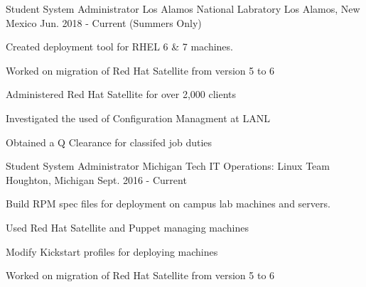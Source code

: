 

\begin{cventries}

  \cventry
    {Student System Administrator} %
    {Los Alamos National Labratory} %
    {Los Alamos, New Mexico} %
    {Jun. 2018 - Current (Summers Only)} %
    {
      \begin{cvitems} %
      \item {Created deployment tool for RHEL 6 \& 7 machines.}
        \item {Worked on migration of Red Hat Satellite from version 5 to 6}
        \item {Administered Red Hat Satellite for over 2,000 clients}
        \item {Investigated the used of Configuration Managment at LANL}
        \item {Obtained a Q Clearance for classifed job duties}
      \end{cvitems}
    }

  \cventry
    {Student System Administrator} %
    {Michigan Tech IT Operations: Linux Team} %
    {Houghton, Michigan} %
    {Sept. 2016 - Current} %
    {
      \begin{cvitems} %
        \item {Build RPM spec files for deployment on campus lab machines and servers.}
        \item {Used Red Hat Satellite and Puppet managing machines}
        \item {Modify Kickstart profiles for deploying machines}	
        \item {Worked on migration of Red Hat Satellite from version 5 to 6}
      \end{cvitems}
    }


\end{cventries}

